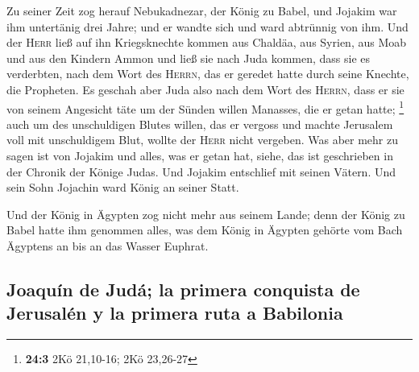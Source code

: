  Zu seiner Zeit zog herauf Nebukadnezar, der König zu
Babel, und Jojakim war ihm untertänig drei Jahre; und er wandte sich und
ward abtrünnig von ihm.  Und der \textsc{Herr} ließ auf
ihn Kriegsknechte kommen aus Chaldäa, aus Syrien, aus Moab und aus den
Kindern Ammon und ließ sie nach Juda kommen, dass sie es verderbten,
nach dem Wort des \textsc{Herrn}, das er geredet hatte durch seine
Knechte, die Propheten.  Es geschah aber Juda also nach
dem Wort des \textsc{Herrn}, dass er sie von seinem Angesicht täte um
der Sünden willen Manasses, die er getan hatte; \footnote{\textbf{24:3}
  2Kö 21,10-16; 2Kö 23,26-27}  auch um des unschuldigen
Blutes willen, das er vergoss und machte Jerusalem voll mit unschuldigem
Blut, wollte der \textsc{Herr} nicht vergeben.  Was aber
mehr zu sagen ist von Jojakim und alles, was er getan hat, siehe, das
ist geschrieben in der Chronik der Könige Judas.  Und
Jojakim entschlief mit seinen Vätern. Und sein Sohn Jojachin ward König
an seiner Statt.

 Und der König in Ägypten zog nicht mehr aus seinem Lande;
denn der König zu Babel hatte ihm genommen alles, was dem König in
Ägypten gehörte vom Bach Ägyptens an bis an das Wasser Euphrat.

\hypertarget{joaquuxedn-de-juduxe1-la-primera-conquista-de-jerusaluxe9n-y-la-primera-ruta-a-babilonia}{%
\subsection{Joaquín de Judá; la primera conquista de Jerusalén y la
primera ruta a
Babilonia}\label{joaquuxedn-de-juduxe1-la-primera-conquista-de-jerusaluxe9n-y-la-primera-ruta-a-babilonia}}

